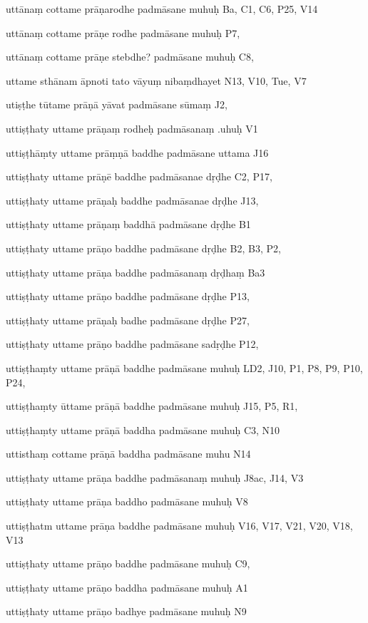 \begin{marma}[hp02_009]
\begin{marma}[hp02_011]
 \begin{marma}[hp02_012]
\item[uttānaṃ cottame prāṇarodhe padmāsane muhuḥ] Ba, C1, C6, P25, V14
\item[uttānaṃ cottame prāṇe rodhe padmāsane muhuḥ] P7, 
\item[uttānaṃ cottame prāṇe stebdhe? padmāsane muhuḥ] C8,
\item[uttame sthānam āpnoti tato vāyuṃ nibaṃdhayet] N13, V10, Tue, V7
\item[utiṣṭhe tūtame prāṇā yāvat padmāsane sūmaṃ] J2,
\item[uttiṣṭhaty uttame prāṇaṃ rodheḥ padmāsanaṃ .uhuḥ] V1
\item[uttiṣṭhāṃty uttame prāṃṇā baddhe padmāsane uttama] J16
\item[uttiṣṭhaty uttame prāṇē baddhe padmāsanae dṛḍhe] C2, P17, 
\item[uttiṣṭhaty uttame prāṇaḥ baddhe padmāsanae dṛḍhe] J13,
\item[uttiṣṭhaty uttame prāṇaṃ baddhā padmāsane dṛḍhe] B1
\item[uttiṣṭhaty uttame prāṇo baddhe padmāsane dṛḍhe] B2, B3, P2,
\item[uttiṣṭhaty uttame prāṇa baddhe padmāsanaṃ dṛḍhaṃ] Ba3
\item[uttiṣṭhaty uttame prāṇo baddhe padmāsane dṛḍhe] P13, 
\item[uttiṣṭhaty uttame prāṇaḥ badhe padmāsane dṛḍhe] P27,
\item[uttiṣṭhaty uttame prāṇo baddhe padmāsane sadṛḍhe] P12,
\item[uttiṣṭhaṃty uttame prāṇā baddhe padmāsane muhuḥ] LD2, J10, P1, P8, P9, P10, P24, 
\item[uttiṣṭhaṃty ūttame prāṇā baddhe padmāsane muhuḥ] J15, P5, R1, 
\item[uttiṣṭhaṃty uttame prāṇā baddha padmāsane muhuḥ] C3, N10
\item[uttisthaṃ cottame prāṇā baddha padmāsane muhu] N14
\item[uttiṣṭhaty uttame prāṇa baddhe padmāsanaṃ muhuḥ] J8ac, J14, V3
\item[uttiṣṭhaty uttame prāṇa baddho padmāsane muhuḥ] V8
\item[uttiṣṭhatm uttame prāṇa baddhe padmāsane muhuḥ] V16, V17, V21, V20, V18, V13
\item[uttiṣṭhaty uttame prāṇo baddhe padmāsane muhuḥ] C9, 
\item[uttiṣṭhaty uttame prāṇo baddha padmāsane muhuḥ] A1
\item[uttiṣṭhaty uttame prāṇo badhye padmāsane muhuḥ] N9

\end{marma}
\end{marma}
\end{marma}
